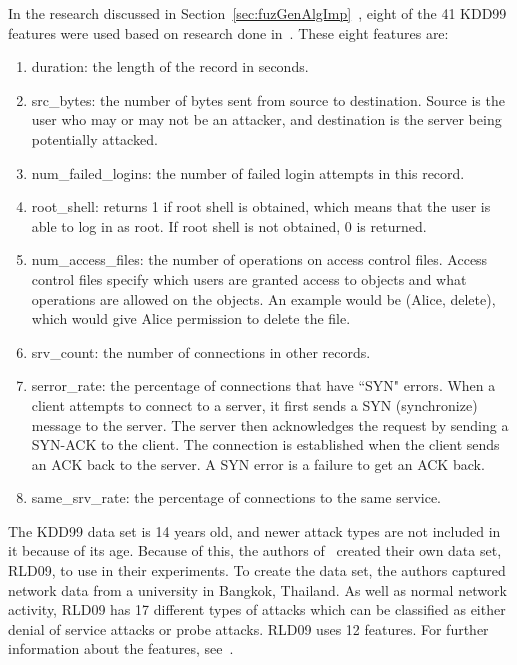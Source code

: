 \documentclass{sig-alternate}
\begin{document}
In the research discussed in Section~\ref{sec:fuzGenAlgImp}~\cite{6496342, 6559603}, eight of the 41 KDD99 features were used based on research done in~\cite{Fries:2008:FAN:1388969.1389037}. These eight features are:
\begin{enumerate}
  \item duration: the length of the record in seconds.
  \item src\_bytes: the number of bytes sent from source to destination. Source is the user who may or may not be an attacker, and destination is the server being potentially attacked.
  \item num\_failed\_logins: the number of failed login attempts in this record.
  \item root\_shell: returns 1 if root shell is obtained, which means that the user is able to log in as root. If root shell is not obtained, 0 is returned.
  \item num\_access\_files: the number of operations on access control files. Access control files specify which users are granted access to objects and what operations are allowed on the objects. An example would be (Alice, delete), which would give Alice permission to delete the file.~\cite{accessControl}
  \item srv\_count: the number of connections in other records.
  \item serror\_rate: the percentage of connections that have ``SYN" errors. When a client attempts to connect to a server, it first sends a SYN (synchronize) message to the server. The server then acknowledges the request by sending a SYN-ACK to the client. The connection is established when the client sends an ACK back to the server. A SYN error is a failure to get an ACK back.~\cite{TCP}
  \item same\_srv\_rate: the percentage of connections to the same service.
\end{enumerate}

The KDD99 data set is 14 years old, and newer attack types are not included in it because of its age. Because of this, the authors of~\cite{6496342, 6559603} created their own data set, RLD09, to use in their experiments. To create the data set, the authors captured network data from a university in Bangkok, Thailand. As well as normal network activity, RLD09 has 17 different types of attacks which can be classified as either denial of service attacks or probe attacks. RLD09 uses 12 features. For further information about the features, see~\cite{6496342, 6559603}.
\end{document}
